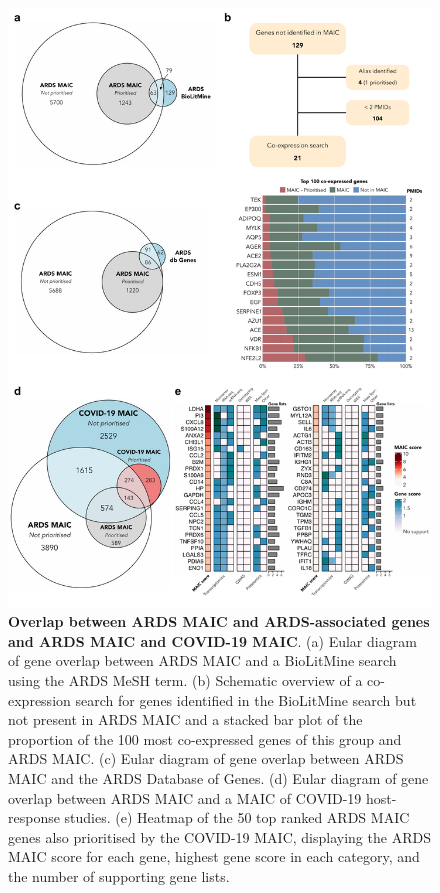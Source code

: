 \documentclass[
  11,
  a4paper,
]{article}
\begin{document}
\begin{figure}

{\centering \includegraphics{../img/Supplementary_Figure_2.png}

}

\caption{\textbf{Overlap between ARDS MAIC and ARDS-associated genes and
ARDS MAIC and COVID-19 MAIC}. (a) Eular diagram of gene overlap between
ARDS MAIC and a BioLitMine search using the ARDS MeSH term. (b)
Schematic overview of a co-expression search for genes identified in the
BioLitMine search but not present in ARDS MAIC and a stacked bar plot of
the proportion of the 100 most co-expressed genes of this group and ARDS
MAIC. (c) Eular diagram of gene overlap between ARDS MAIC and the ARDS
Database of Genes. (d) Eular diagram of gene overlap between ARDS MAIC
and a MAIC of COVID-19 host-response studies. (e) Heatmap of the 50 top
ranked ARDS MAIC genes also prioritised by the COVID-19 MAIC, displaying
the ARDS MAIC score for each gene, highest gene score in each category,
and the number of supporting gene lists.}

\end{figure}
\end{document}
